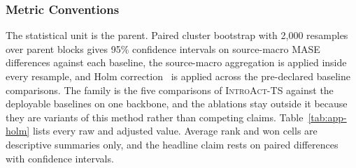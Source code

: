 \documentclass{article}
\newcommand{\introact}{\textsc{IntroAct-TS}}
\begin{document}
\subsubsection{Metric Conventions}
\label{app:metric-conventions}
The statistical unit is the parent. Paired cluster bootstrap with 2,000 resamples
over parent blocks gives 95\% confidence intervals on source-macro MASE differences against
each baseline, the source-macro aggregation is applied inside every resample, and Holm
correction~\citep{holm1979simple} is applied across the pre-declared baseline comparisons.
The family is the five comparisons of \introact{} against the deployable baselines on one
backbone, and the ablations stay outside it because they are variants of this method rather
than competing claims. Table~\ref{tab:app-holm} lists every raw and adjusted value.
Average rank and won cells are descriptive summaries only, and the headline claim rests on
paired differences with confidence intervals.
\end{document}
